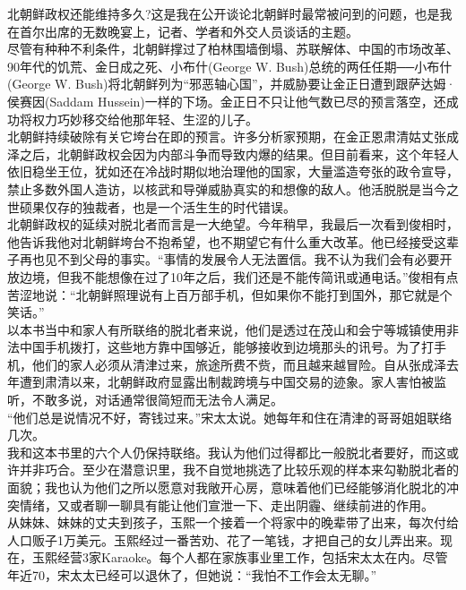 北朝鲜政权还能维持多久?这是我在公开谈论北朝鲜时最常被问到的问题，也是我在首尔出席的无数晚宴上，记者、学者和外交人员谈话的主题。\\

尽管有种种不利条件，北朝鲜撑过了柏林围墙倒塌、苏联解体、中国的市场改革、90年代的饥荒、金日成之死、小布什(George W. Bush)总统的两任任期──小布什(George W. Bush)将北朝鲜列为“邪恶轴心国”，并威胁要让金正日遭到跟萨达姆·侯赛因(Saddam Hussein)一样的下场。金正日不只让他气数已尽的预言落空，还成功将权力巧妙移交给他那年轻、生涩的儿子。\\

北朝鲜持续破除有关它垮台在即的预言。许多分析家预期，在金正恩肃清姑丈张成泽之后，北朝鲜政权会因为内部斗争而导致内爆的结果。但目前看来，这个年轻人依旧稳坐王位，犹如还在冷战时期似地治理他的国家，大量滥造夸张的政令宣导，禁止多数外国人造访，以核武和导弹威胁真实的和想像的敌人。他活脱脱是当今之世硕果仅存的独裁者，也是一个活生生的时代错误。\\

北朝鲜政权的延续对脱北者而言是一大绝望。今年稍早，我最后一次看到俊相时，他告诉我他对北朝鲜垮台不抱希望，也不期望它有什么重大改革。他已经接受这辈子再也见不到父母的事实。“事情的发展令人无法置信。我不认为我们会有必要开放边境，但我不能想像在过了10年之后，我们还是不能传简讯或通电话。”俊相有点苦涩地说：“北朝鲜照理说有上百万部手机，但如果你不能打到国外，那它就是个笑话。”\\

以本书当中和家人有所联络的脱北者来说，他们是透过在茂山和会宁等城镇使用非法中国手机拨打，这些地方靠中国够近，能够接收到边境那头的讯号。为了打手机，他们的家人必须从清津过来，旅途所费不赀，而且越来越冒险。自从张成泽去年遭到肃清以来，北朝鲜政府显露出制裁跨境与中国交易的迹象。家人害怕被监听，不敢多说，对话通常很简短而无法令人满足。\\

“他们总是说情况不好，寄钱过来。”宋太太说。她每年和住在清津的哥哥姐姐联络几次。\\

我和这本书里的六个人仍保持联络。我认为他们过得都比一般脱北者要好，而这或许并非巧合。至少在潜意识里，我不自觉地挑选了比较乐观的样本来勾勒脱北者的面貌；我也认为他们之所以愿意对我敞开心房，意味着他们已经能够消化脱北的冲突情绪，又或者聊一聊具有能让他们宣泄一下、走出阴霾、继续前进的作用。\\

从妹妹、妹妹的丈夫到孩子，玉熙一个接着一个将家中的晚辈带了出来，每次付给人口贩子1万美元。玉熙经过一番苦劝、花了一笔钱，才把自己的女儿弄出来。现在，玉熙经营3家Karaoke。每个人都在家族事业里工作，包括宋太太在内。尽管年近70，宋太太已经可以退休了，但她说：“我怕不工作会太无聊。”\\

